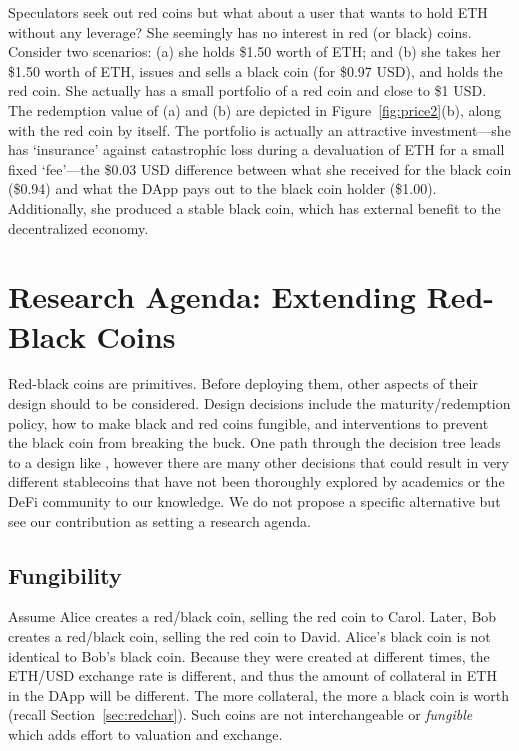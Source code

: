 Speculators seek out red coins but what about a user that wants to hold ETH without any leverage? She seemingly has no interest in red (or black) coins. Consider two scenarios: (a) she holds \$1.50 worth of ETH; and (b) she takes her \$1.50 worth of ETH, issues and sells a black coin (\eg for \$0.97 USD), and holds the red coin. She actually has a small portfolio of a red coin and close to \$1 USD. The redemption value of (a) and (b) are depicted in Figure~\ref{fig:price2}(b), along with the red coin by itself. The portfolio is actually an attractive investment---she has `insurance' against catastrophic loss during a devaluation of ETH for a small fixed `fee'---the \$0.03 USD difference between what she received for the black coin (\$0.94) and what the DApp pays out to the black coin holder (\$1.00). Additionally, she produced a stable black coin, which has external benefit to the decentralized economy. 


\section{Research Agenda: Extending Red-Black Coins}
\label{sec:taxonomy}

Red-black coins are primitives. Before deploying them, other aspects of their design should to be considered. Design decisions include the maturity/redemption policy, how to make black and red coins fungible, and interventions to prevent the black coin from breaking the buck. One path through the decision tree leads to a design like \dai, however there are many other decisions that could result in very different stablecoins that have not been thoroughly explored by academics or the DeFi community to our knowledge. We do not propose a specific alternative but see our contribution as setting a research agenda. 



\subsection{Fungibility}

Assume Alice creates a red/black coin, selling the red coin to Carol. Later, Bob creates a red/black coin, selling the red coin to David. Alice's black coin is not identical to Bob's black coin. Because they were created at different times, the ETH/USD exchange rate is different, and thus the  amount of collateral in ETH in the DApp will be different. The more collateral, the more a black coin is worth (recall Section~\ref{sec:redchar}). Such coins are not interchangeable or \textit{fungible} which adds effort to valuation and exchange. 

